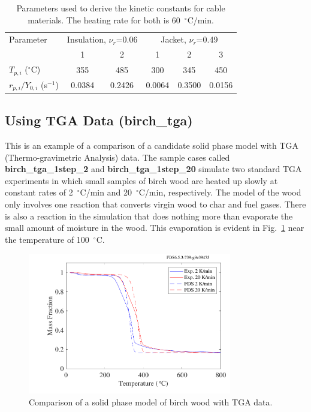 \documentclass[11pt]{book}
\begin{document}
\begin{table}[ht]
\begin{center}
\caption{Parameters used to derive the kinetic constants for cable materials. The heating rate for both is
60~$^\circ$C/min.}
\label{cable_parameters}
\begin{tabular}{|l||c|c||c|c|c|}
\hline
Parameter                       & \multicolumn{2}{|c|}{Insulation, $\nu_r$=0.06 }  &  \multicolumn{3}{|c|}{Jacket, $\nu_r$=0.49} \\ \cline{2-6}
                                & 1             & 2                 &  1        & 2         & 3              \\ \hline \hline
$T_{p,i}$ ($^\circ$C)           & 355           & 485               &  300      & 345       & 450            \\ \hline
$r_{p,i}/Y_{0,i}$ (s$^{-1}$)    & 0.0384        & 0.2426            &  0.0064   & 0.3500    & 0.0156         \\ \hline
\end{tabular}
\end{center}
\end{table}


\subsection{Using TGA Data (\texorpdfstring{{\bf birch\_tga}}{birch\_tga})}
\label{birch_tga}

This is an example of a comparison of a candidate solid phase model with TGA (Thermo-gravimetric Analysis) data. The sample cases
called {\bf birch\_tga\_1step\_2} and {\bf birch\_tga\_1step\_20} simulate two standard TGA experiments in which small samples of birch wood are heated up slowly at constant
rates of 2~$^\circ$C/min and 20~$^\circ$C/min, respectively. The model of the wood only involves one reaction that converts virgin wood to char and fuel gases. There is
also a reaction in the simulation that does nothing more than evaporate the small amount of moisture in the wood. This evaporation is evident in
Fig.~\ref{fig_birch_tga} near the temperature of 100~$^\circ$C.

\begin{figure}[ht]
   \begin{center}
      \includegraphics[width=3.5in]{SCRIPT_FIGURES/birch_tga}
      \caption[An example of TGA data.]{\label{fig_birch_tga}
    Comparison of a solid phase model of birch wood with TGA data.}
   \end{center}
   \end{figure}
\end{document}
